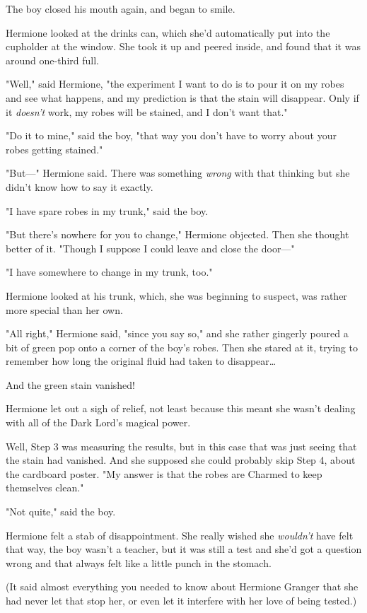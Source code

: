 The boy closed his mouth again, and began to smile.

Hermione looked at the drinks can, which she'd automatically put into the
cupholder at the window. She took it up and peered inside, and found that it
was around one-third full.

"Well," said Hermione, "the experiment I want to do is to pour it on my robes
and see what happens, and my prediction is that the stain will disappear. Only
if it \emph{doesn't} work, my robes will be stained, and I don't want that."

"Do it to mine," said the boy, "that way you don't have to worry about your
robes getting stained."

"But---" Hermione said. There was something \emph{wrong} with that thinking but
she didn't know how to say it exactly.

"I have spare robes in my trunk," said the boy.

"But there's nowhere for you to change," Hermione objected. Then she thought
better of it. "Though I suppose I could leave and close the door---"

"I have somewhere to change in my trunk, too."

Hermione looked at his trunk, which, she was beginning to suspect, was rather
more special than her own.

"All right," Hermione said, "since you say so," and she rather gingerly poured
a bit of green pop onto a corner of the boy's robes. Then she stared at it,
trying to remember how long the original fluid had taken to disappear{\ldots}

And the green stain vanished!

Hermione let out a sigh of relief, not least because this meant she wasn't
dealing with all of the Dark Lord's magical power.

Well, Step 3 was measuring the results, but in this case that was just seeing
that the stain had vanished. And she supposed she could probably skip Step 4,
about the cardboard poster. "My answer is that the robes are Charmed to keep
themselves clean."

"Not quite," said the boy.

Hermione felt a stab of disappointment. She really wished she \emph{wouldn't}
have felt that way, the boy wasn't a teacher, but it was still a test and she'd
got a question wrong and that always felt like a little punch in the stomach.

(It said almost everything you needed to know about Hermione Granger that she
had never let that stop her, or even let it interfere with her love of being
tested.)


